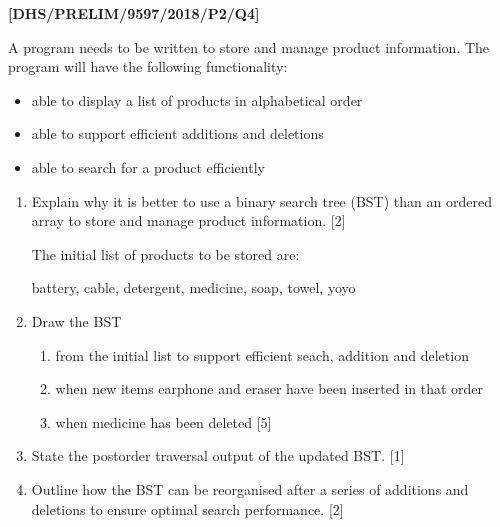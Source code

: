 \item \textbf{{[}DHS/PRELIM/9597/2018/P2/Q4{]} }

A program needs to be written to store and manage product information.
The program will have the following functionality:
\begin{itemize}
\item able to display a list of products in alphabetical order 
\item able to support efficient additions and deletions 
\item able to search for a product efficiently
\end{itemize}
\begin{enumerate}
\item Explain why it is better to use a binary search tree (BST) than an
ordered array to store and manage product information\hfill{}. {[}2{]}

The initial list of products to be stored are: 
\noindent \begin{center}
battery, cable, detergent, medicine, soap, towel, yoyo
\par\end{center}
\item Draw the BST 
\begin{enumerate}
\item from the initial list to support efficient seach, addition and deletion 
\item when new items earphone and eraser have been inserted in that order
\item when medicine has been deleted \hfill{}{[}5{]}
\end{enumerate}
\item State the postorder traversal output of the updated BST. \hfill{}{[}1{]}
\item Outline how the BST can be reorganised after a series of additions
and deletions to ensure optimal search performance.\hfill{} {[}2{]}
\end{enumerate}
